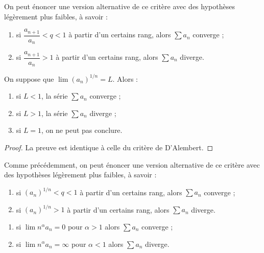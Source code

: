\documentclass[french]{article}
\begin{document}
\begin{rmq}
On peut énoncer une version alternative de ce critère avec des hypothèses légèrement plus faibles, à savoir :
\begin{enumerate}[label=(\roman*)]
\item si $\dfrac{a_{n+1}}{a_n} < q < 1$ à partir d'un certains rang, alors $\sum a_n$ converge ;
\item si $\dfrac{a_{n+1}}{a_n} > 1$ à partir d'un certains rang, alors $\sum a_n$ diverge.
\end{enumerate}
\end{rmq}

\begin{thm}
On suppose que $\lim (a_n)^{1/n} = L$. Alors :
\begin{enumerate}[label=(\roman*)]
\item si $L < 1$, la série $\sum a_n$ converge ;
\item si $L>1$, la série $\sum a_n$ diverge ;
\item si $L=1$, on ne peut pas conclure.
\end{enumerate}
\end{thm}

\begin{proof}
La preuve est identique à celle du critère de D'Alembert.
\end{proof}

\begin{rmq}
Comme précédemment, on peut énoncer une version alternative de ce critère avec des hypothèses légèrement plus faibles, à savoir :
\begin{enumerate}[label=(\roman*)]
\item si $(a_n)^{1/n} < q < 1$ à partir d'un certains rang, alors $\sum a_n$ converge ;
\item si $(a_n)^{1/n} > 1$ à partir d'un certains rang, alors $\sum a_n$ diverge.
\end{enumerate}
\end{rmq}

\begin{thm}
\begin{enumerate}[label=(\roman*)]
\item si $\lim n^{\alpha} a_n = 0$ pour $\alpha > 1$ alors $\sum a_n$ converge ;
\item si $\lim n^{\alpha} a_n = \infty$ pour $\alpha < 1$ alors $\sum a_n$ diverge.
\end{enumerate}
\end{thm}
\end{document}
